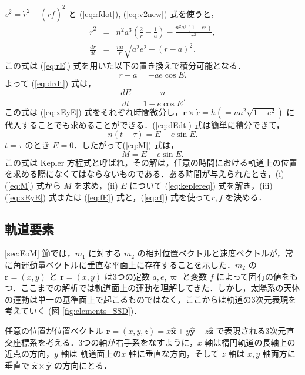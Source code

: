\documentclass[11pt,a4paper,oneside,onecolumn]{jreport}
\begin{document}
$v^2 = \dot{r}^2 + (r \dot{f})^2$ と (\ref{eq:rfdot}), (\ref{eq:v2new}) 式を使うと，
\begin{eqnarray}
\dot{r}^2 & = & n^2 a^3 \left( \frac{2}{r} - \frac{1}{a} \right) - \frac{n^2 a^4 (1 - e^2)}{r^2}, \\
\frac{dr}{dt} & = & \frac{na}{r} \sqrt{a^2 e^2 - (r - a)^2}. \label{eq:drdt}
\end{eqnarray}
この式は (\ref{eq:rE}) 式を用いた以下の置き換えで積分可能となる．
\begin{equation}
r - a = - a e \cos E.
\end{equation}
よって (\ref{eq:drdt}) 式は，
\begin{equation}
\frac{dE}{dt} = \frac{n}{1 - e \cos E}. \label{eq:dEdt}
\end{equation}
この式は (\ref{eq:xEyE}) 式をそれぞれ時間微分し，${\bm r} \times \dot{{\bm r}} = h ( = n a^2 \sqrt{1 - e^2} )$ に代入することでも求めることができる．(\ref{eq:dEdt}) 式は簡単に積分できて，
\begin{equation}
n (t - \tau) = E - e \sin E. \label{eq:tauE}
\end{equation}
$t = \tau$ のとき $E = 0$．したがって(\ref{eq:M}) 式は，
\begin{equation}
M = E - e \sin E. \label{eq:keplereq}
\end{equation}
この式は Kepler 方程式と呼ばれ，その解は，任意の時間における軌道上の位置を求める際になくてはならないものである．ある時間が与えられたとき，(i) (\ref{eq:M}) 式から $M$ を求め，(ii) $E$ について (\ref{eq:keplereq}) 式を解き，(iii) (\ref{eq:xEyE}) 式または (\ref{eq:fE}) 式と，(\ref{eq:rf}) 式を使って$r, f$ を決める．

\subsection{軌道要素 \label{sec:elements}}
 \ref{sec:EoM} 節では，$m_1$ に対する $m_2$ の相対位置ベクトルと速度ベクトルが，常に角運動量ベクトルに垂直な平面上に存在することを示した．$m_2$ の ${\bm r} = (x, y)$ と $\dot{\bm r} = (\dot{x}, \dot{y})$ は3つの定数 $a, e, \varpi$ と変数 $f$ によって固有の値をもつ．ここまでの解析では軌道面上の運動を理解してきた．しかし，太陽系の天体の運動は単一の基準面上で起こるものではなく，ここからは軌道の3次元表現を考えていく (図 \ref{fig:elements_SSD})．
 
任意の位置が位置ベクトル ${\bm r} = (x, y, z) = x \hat{\bm x} + y \hat{\bm y} + z \hat{\bm z}$ で表現される3次元直交座標系を考える．3つの軸が右手系をなすように，$x$ 軸は楕円軌道の長軸上の近点の方向，$y$ 軸は 軌道面上の$x$ 軸に垂直な方向，そして $z$ 軸は $x, y$ 軸両方に垂直で $\hat{\bm x} \times \hat{\bm y}$ の方向にとる．
\end{document}
